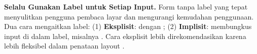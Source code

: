 \begin{konsep}
\textbf{Selalu Gunakan Label untuk Setiap Input.} Form tanpa label yang tepat menyulitkan pengguna pembaca layar dan mengurangi kemudahan penggunaan. Dua cara mengaitkan label: (1) \textbf{Eksplisit}:  dengan ; (2) \textbf{Implisit}: membungkus input di dalam label, misalnya . Cara eksplisit lebih direkomendasikan karena lebih fleksibel dalam penataan layout \cite{webdevAccessibility}.
\end{konsep}

